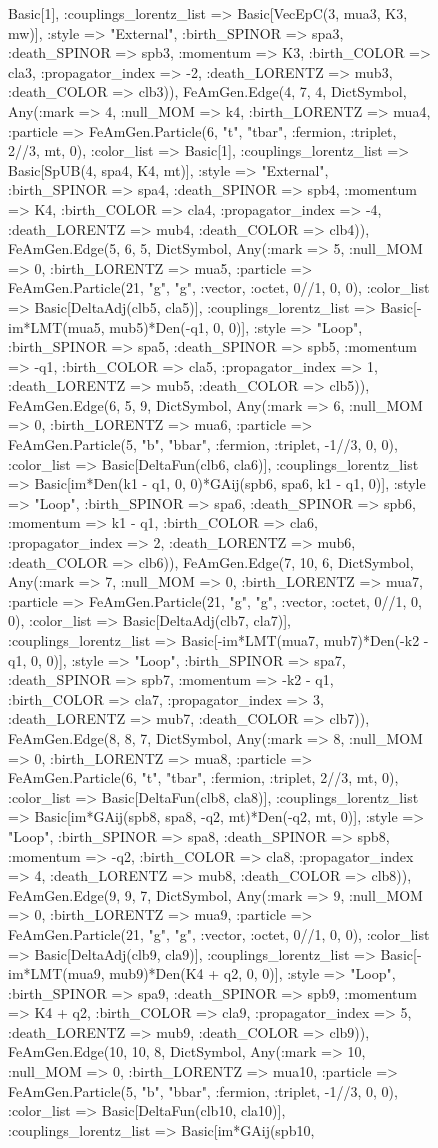 \documentclass{revtex4}
\begin{document}
\begin{figure}[!htb]
\begin{center}
{Basic[1], :couplings_lorentz_list => Basic[VecEpC(3, mua3, K3, mw)], :style => "External", :birth_SPINOR => spa3, :death_SPINOR => spb3, :momentum => K3, :birth_COLOR => cla3, :propagator_index => -2, :death_LORENTZ => mub3, :death_COLOR => clb3)), FeAmGen.Edge(4, 7, 4, Dict{Symbol, Any}(:mark => 4, :null_MOM => k4, :birth_LORENTZ => mua4, :particle => FeAmGen.Particle(6, "t", "tbar", :fermion, :triplet, 2//3, mt, 0), :color_list => Basic[1], :couplings_lorentz_list => Basic[SpUB(4, spa4, K4, mt)], :style => "External", :birth_SPINOR => spa4, :death_SPINOR => spb4, :momentum => K4, :birth_COLOR => cla4, :propagator_index => -4, :death_LORENTZ => mub4, :death_COLOR => clb4)), FeAmGen.Edge(5, 6, 5, Dict{Symbol, Any}(:mark => 5, :null_MOM => 0, :birth_LORENTZ => mua5, :particle => FeAmGen.Particle(21, "g", "g", :vector, :octet, 0//1, 0, 0), :color_list => Basic[DeltaAdj(clb5, cla5)], :couplings_lorentz_list => Basic[-im*LMT(mua5, mub5)*Den(-q1, 0, 0)], :style => "Loop", :birth_SPINOR => spa5, :death_SPINOR => spb5, :momentum => -q1, :birth_COLOR => cla5, :propagator_index => 1, :death_LORENTZ => mub5, :death_COLOR => clb5)), FeAmGen.Edge(6, 5, 9, Dict{Symbol, Any}(:mark => 6, :null_MOM => 0, :birth_LORENTZ => mua6, :particle => FeAmGen.Particle(5, "b", "bbar", :fermion, :triplet, -1//3, 0, 0), :color_list => Basic[DeltaFun(clb6, cla6)], :couplings_lorentz_list => Basic[im*Den(k1 - q1, 0, 0)*GAij(spb6, spa6, k1 - q1, 0)], :style => "Loop", :birth_SPINOR => spa6, :death_SPINOR => spb6, :momentum => k1 - q1, :birth_COLOR => cla6, :propagator_index => 2, :death_LORENTZ => mub6, :death_COLOR => clb6)), FeAmGen.Edge(7, 10, 6, Dict{Symbol, Any}(:mark => 7, :null_MOM => 0, :birth_LORENTZ => mua7, :particle => FeAmGen.Particle(21, "g", "g", :vector, :octet, 0//1, 0, 0), :color_list => Basic[DeltaAdj(clb7, cla7)], :couplings_lorentz_list => Basic[-im*LMT(mua7, mub7)*Den(-k2 - q1, 0, 0)], :style => "Loop", :birth_SPINOR => spa7, :death_SPINOR => spb7, :momentum => -k2 - q1, :birth_COLOR => cla7, :propagator_index => 3, :death_LORENTZ => mub7, :death_COLOR => clb7)), FeAmGen.Edge(8, 8, 7, Dict{Symbol, Any}(:mark => 8, :null_MOM => 0, :birth_LORENTZ => mua8, :particle => FeAmGen.Particle(6, "t", "tbar", :fermion, :triplet, 2//3, mt, 0), :color_list => Basic[DeltaFun(clb8, cla8)], :couplings_lorentz_list => Basic[im*GAij(spb8, spa8, -q2, mt)*Den(-q2, mt, 0)], :style => "Loop", :birth_SPINOR => spa8, :death_SPINOR => spb8, :momentum => -q2, :birth_COLOR => cla8, :propagator_index => 4, :death_LORENTZ => mub8, :death_COLOR => clb8)), FeAmGen.Edge(9, 9, 7, Dict{Symbol, Any}(:mark => 9, :null_MOM => 0, :birth_LORENTZ => mua9, :particle => FeAmGen.Particle(21, "g", "g", :vector, :octet, 0//1, 0, 0), :color_list => Basic[DeltaAdj(clb9, cla9)], :couplings_lorentz_list => Basic[-im*LMT(mua9, mub9)*Den(K4 + q2, 0, 0)], :style => "Loop", :birth_SPINOR => spa9, :death_SPINOR => spb9, :momentum => K4 + q2, :birth_COLOR => cla9, :propagator_index => 5, :death_LORENTZ => mub9, :death_COLOR => clb9)), FeAmGen.Edge(10, 10, 8, Dict{Symbol, Any}(:mark => 10, :null_MOM => 0, :birth_LORENTZ => mua10, :particle => FeAmGen.Particle(5, "b", "bbar", :fermion, :triplet, -1//3, 0, 0), :color_list => Basic[DeltaFun(clb10, cla10)], :couplings_lorentz_list => Basic[im*GAij(spb10, }
\end{center}
\end{figure}
\end{document}
